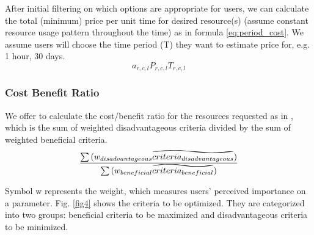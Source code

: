 After initial filtering on which options are appropriate for users, we can calculate the total (minimum) price per unit time for desired resource(s) (assume constant resource usage pattern throughout the time) as in formula \eqref{eq:period_cost}. We assume users will choose the time period (T) they want to estimate price for, e.g. 1 hour, 30 days.
\begin{equation}\label{eq:period_cost}
{a_{r,c,l}}{P_{r,c,l}}{T_{r,c,l}}
\end{equation}

\subsubsection{Cost Benefit Ratio}
\label{sec:cost_benefit_ratio}
We offer to calculate the cost/benefit ratio for the resources requested as in , which is the sum of weighted disadvantageous criteria divided by the sum of weighted beneficial criteria.
\begin{equation}\label{eq:ratio}
\frac{  \sum{ ( w_{disadvantageous}\reallywidetilde{criteria_{disadvantageous}} ) }  }
{  \sum{ ( w_{beneficial} \reallywidetilde{criteria_{beneficial}} ) }  }
\end{equation}

Symbol w represents the weight, which measures users' perceived importance on a parameter. Fig. \ref{fig4} shows the criteria to be optimized. They are categorized into two groups: beneficial criteria to be maximized and disadvantageous criteria to be minimized.

